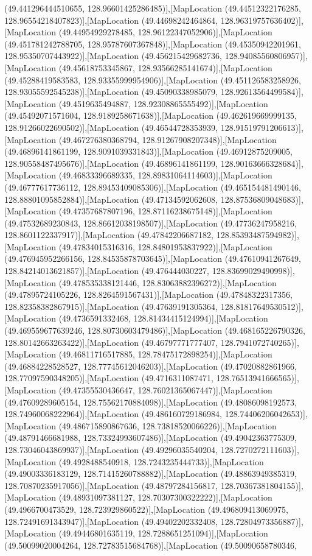 (49.441296444510655, 128.96601425286485)],[MapLocation (49.44512322176285, 128.96554218407823)],[MapLocation (49.44698242464864, 128.96319757636402)],[MapLocation (49.44954929278485, 128.96122347052906)],[MapLocation (49.451781242788705, 128.95787607367848)],[MapLocation (49.45350942201961, 128.95350707443922)],[MapLocation (49.456215429682736, 128.94085560806957)],[MapLocation (49.45618753345867, 128.93566285141674)],[MapLocation (49.45288419583583, 128.93355999954906)],[MapLocation (49.451126583258926, 128.93055592545238)],[MapLocation (49.45090338985079, 128.92613564499584)],[MapLocation (49.4519635494887, 128.92308865555492)],[MapLocation (49.45492071571604, 128.9189258671638)],[MapLocation (49.462619669999135, 128.91266022690502)],[MapLocation (49.46544728353939, 128.91519791206613)],[MapLocation (49.467276380368794, 128.91267908207348)],[MapLocation (49.46896141861199, 128.9091039331843)],[MapLocation (49.46912875209005, 128.90558487495676)],[MapLocation (49.46896141861199, 128.90163666328684)],[MapLocation (49.46833396689335, 128.89831064114603)],[MapLocation (49.46777617736112, 128.89453409085306)],[MapLocation (49.465154481490146, 128.88801095852884)],[MapLocation (49.47134592062608, 128.87536809048683)],[MapLocation (49.47357687807196, 128.87116238675148)],[MapLocation (49.47532689230843, 128.86612038198507)],[MapLocation (49.47736247958216, 128.8601122337917)],[MapLocation (49.47842206687182, 128.85393487594982)],[MapLocation (49.47834015316316, 128.84801953837922)],[MapLocation (49.476945952266156, 128.84535878703645)],[MapLocation (49.47610941267649, 128.84214013621857)],[MapLocation (49.476444030227, 128.83699029490998)],[MapLocation (49.478535338121446, 128.83063882396272)],[MapLocation (49.47895724105226, 128.8264591567431)],[MapLocation (49.47848322317356, 128.82358382867915)],[MapLocation (49.47639191305364, 128.81817649530512)],[MapLocation (49.4736591332468, 128.81434415124994)],[MapLocation (49.469559677639246, 128.80730603479486)],[MapLocation (49.468165226790326, 128.80142663263422)],[MapLocation (49.46797771777407, 128.7941072740265)],[MapLocation (49.46811716517885, 128.78475172898254)],[MapLocation (49.46884228528527, 128.77745612046203)],[MapLocation (49.47020882861966, 128.77097590348205)],[MapLocation (49.4716311087471, 128.76513941666565)],[MapLocation (49.47355530436647, 128.76021365067447)],[MapLocation (49.47609289605154, 128.75562170884098)],[MapLocation (49.48086098192573, 128.74960068222964)],[MapLocation (49.486160729186984, 128.74406206042653)],[MapLocation (49.486715890867636, 128.73818520066226)],[MapLocation (49.48791466681988, 128.73324993607486)],[MapLocation (49.49042363775309, 128.73046043869937)],[MapLocation (49.49296035540204, 128.7270272111603)],[MapLocation (49.4928488540918, 128.7243235444733)],[MapLocation (49.49003336183129, 128.71415260788882)],[MapLocation (49.48863949385319, 128.70870235917056)],[MapLocation (49.48797284156817, 128.70367381804155)],[MapLocation (49.48931097381127, 128.70307300322222)],[MapLocation (49.4966700473529, 128.723929860522)],[MapLocation (49.496809413069975, 128.72491691343947)],[MapLocation (49.49402202332408, 128.72804973356887)],[MapLocation (49.49446801635119, 128.7288651251094)],[MapLocation (49.50099020004264, 128.72783515684768)],[MapLocation (49.50090658780346, 